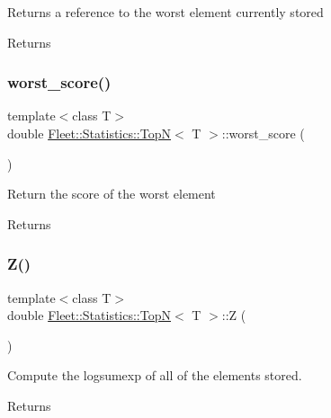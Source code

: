 Returns a reference to the worst element currently stored \begin{DoxyReturn}{Returns}

\end{DoxyReturn}
\mbox{\label{class_fleet_1_1_statistics_1_1_top_n_abb7a4016cfe775eb7b5058f1dd8edd0d}} 
\subsubsection{\texorpdfstring{worst\+\_\+score()}{worst\_score()}}
{\footnotesize\ttfamily template$<$class T$>$ \\
double \hyperlink{class_fleet_1_1_statistics_1_1_top_n}{Fleet\+::\+Statistics\+::\+TopN}$<$ T $>$\+::worst\+\_\+score (\begin{DoxyParamCaption}{ }\end{DoxyParamCaption})\hspace{0.3cm}{\ttfamily [inline]}}

Return the score of the worst element \begin{DoxyReturn}{Returns}

\end{DoxyReturn}
\mbox{\label{class_fleet_1_1_statistics_1_1_top_n_aa94e0f1e4df0ba70b35abcc540b7cb03}} 
\subsubsection{\texorpdfstring{Z()}{Z()}}
{\footnotesize\ttfamily template$<$class T$>$ \\
double \hyperlink{class_fleet_1_1_statistics_1_1_top_n}{Fleet\+::\+Statistics\+::\+TopN}$<$ T $>$\+::Z (\begin{DoxyParamCaption}{ }\end{DoxyParamCaption})\hspace{0.3cm}{\ttfamily [inline]}}

Compute the logsumexp of all of the elements stored. \begin{DoxyReturn}{Returns}

\end{DoxyReturn}


